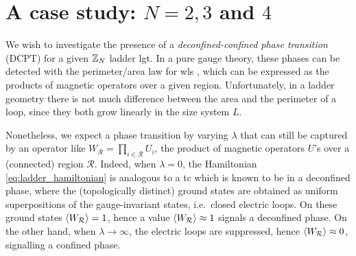 \section{A case study: \texorpdfstring{$N=2, 3$}{N=2, 3} and \texorpdfstring{$4$}{4}}
\label{sec:a_case_study_N_2_3_4}

\newcommand{\ZTwoWilsonGraph}[1]{
        \nextgroupplot
        \addplot+[thick] table [y=10x2] {assets/graphs/data/Z2_wilson_#1.csv};
        \addplot+[thick] table [y=12x2] {assets/graphs/data/Z2_wilson_#1.csv};
        \addplot+[thick] table [y=14x2] {assets/graphs/data/Z2_wilson_#1.csv};
        \addplot+[thick] table [y=16x2] {assets/graphs/data/Z2_wilson_#1.csv};
        \addplot+[thick] table [y=18x2] {assets/graphs/data/Z2_wilson_#1.csv};
}
\newcommand{\ZThreeWilsonGraph}[1]{
        \nextgroupplot
        \addplot+[thick] table [y=7x2]  {assets/graphs/data/Z3_wilson_#1.csv};
        \addplot+[thick] table [y=9x2]  {assets/graphs/data/Z3_wilson_#1.csv};
        \addplot+[thick] table [y=11x2] {assets/graphs/data/Z3_wilson_#1.csv};
        \addplot+[thick] table [y=13x2] {assets/graphs/data/Z3_wilson_#1.csv};
}
\newcommand{\ZFourWilsonGraph}[1]{
    \nextgroupplot
    \addplot+ [thick] table [y=6x2]  {assets/graphs/data/Z4_wilson_#1.csv};
    \addplot+ [thick] table [y=8x2]  {assets/graphs/data/Z4_wilson_#1.csv};
    \addplot+ [thick] table [y=10x2] {assets/graphs/data/Z4_wilson_#1.csv};
}









We wish to investigate the presence of a \emph{deconfined-confined phase transition} (DCPT) for a given $\mathbb{Z}_N$ ladder \ac{lgt}.
In a pure gauge theory, these phases can be detected
with the perimeter/area law for \ac{wl}s \cite{wilson1974confinement},
which can be expressed as the products of magnetic operators over a given region.
Unfortunately, in a  ladder geometry there is not much difference between the area and the perimeter of a loop, since they both grow linearly in the size system $L$.

Nonetheless, we expect a phase transition by varying $\lambda$ \cite{trebst2007topological, hamma2008adiabatic, tagliacozzo2011entanglement} that can still be captured by an operator like $W_{\mathcal{R}}= \prod_{i \in \mathcal{R}} U_{i}$, the product of magnetic operators $U$'s over a (connected) region $\mathcal{R}$.
Indeed, when $\lambda=0$, the Hamiltonian \eqref{eq:ladder_hamiltonian} is analogous to a \ac{tc} \cite{kitaev2003fault} which is known to be in a deconfined phase, where the (topologically distinct) ground states are obtained as uniform superpositions of the gauge-invariant states, i.e.~closed electric loops.
On these ground states $\ev{W_{\mathcal{R}}} = 1$, hence
 a value $\ev{W_{\mathcal{R}}} \approx 1$ signals a deconfined phase.
On the other hand, when $\lambda \rightarrow \infty$, the electric loops are suppressed, hence
$\ev{W_{\mathcal{R}}} \approx 0$, signalling a confined phase.

